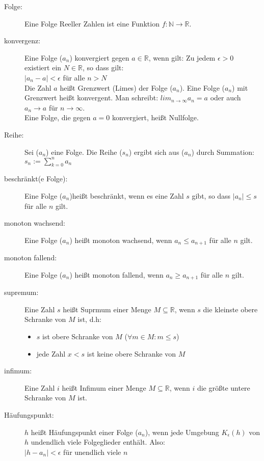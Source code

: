 \begin{description}
  \item [Folge:]
    Eine Folge Reeller Zahlen ist eine Funktion 
    $f : \mathbb{N} \rightarrow \mathbb{R}$.

  \item [konvergenz:]
    Eine Folge ($a_n$) konvergiert gegen $a \in \mathbb{R}$, wenn gilt: 
    Zu jedem $\epsilon > 0$ existiert ein $N \in \mathbb{R}$, so dass gilt:\\
    $|a_n - a| < \epsilon$ für alle $n > N$\\
    Die Zahl $a$ heißt Grenzwert (Limes) der Folge ($a_n$). Eine Folge ($a_n$) 
    mit Grenzwert heißt konvergent. Man schreibt: 
    $lim_{n\rightarrow \infty} a_n = a$ oder auch $a_n \rightarrow a$ für 
    $n \rightarrow \infty$.\\
    Eine Folge, die gegen $a = 0$ konvergiert, heißt Nullfolge.

  \item [Reihe:]
    Sei ($a_n$) eine Folge. Die Reihe ($s_n$) ergibt sich aus ($a_n$) durch 
    Summation: $s_n := \sum_{k=0}^{n} a_n$

  \item [beschränkt(e Folge):]
    Eine Folge ($a_n$)heißt beschränkt, wenn es eine Zahl $s$ gibt, so dass 
    $|a_n| \leq s$ für alle $n$ gilt.

  \item [monoton wachsend:]
    Eine Folge ($a_n$) heißt monoton wachsend, wenn $a_n \leq a_{n+1}$ für alle 
    $n$ gilt.

  \item [monoton fallend:]
    Eine Folge ($a_n$) heißt monoton fallend, wenn $a_n \geq a_{n+1}$ für alle 
    $n$ gilt.

  \item [supremum:]
    Eine Zahl $s$ heißt Suprmum einer Menge $M \subseteq \mathbb{R}$, wenn $s$ 
    die kleinste obere Schranke von $M$ ist, d.h:
    \begin{itemize}
      \item $s$ ist obere Schranke von $M$ ($\forall m \in M : m \leq s$)
      \item jede Zahl $x < s$ ist keine obere Schranke von $M$
    \end{itemize}

  \item [infimum:]
    Eine Zahl $i$ heißt Infimum einer Menge $M \subseteq \mathbb{R}$, wenn $i$
    die größte untere Schranke von $M$ ist.

  \item [Häufungspunkt:]
    $h$ heißt Häufungspunkt einer Folge ($a_n$), wenn jede Umgebung 
    $K_\epsilon (h)$ von $h$ undendlich viele Folgeglieder enthält. Also:\\
    $|h - a_n| < \epsilon$ für unendlich viele $n$


\end{description}
